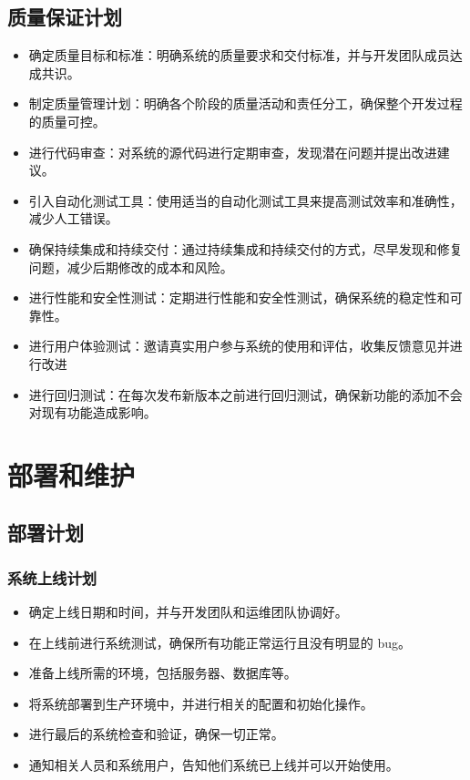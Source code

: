 \documentclass{article}
\begin{document}
\subsection{质量保证计划}
\begin{itemize}
	\item 确定质量目标和标准：明确系统的质量要求和交付标准，并与开发团队成员达成共识。
	\item 制定质量管理计划：明确各个阶段的质量活动和责任分工，确保整个开发过程的质量可控。
	\item 进行代码审查：对系统的源代码进行定期审查，发现潜在问题并提出改进建议。
	\item 引入自动化测试工具：使用适当的自动化测试工具来提高测试效率和准确性，减少人工错误。
	\item 确保持续集成和持续交付：通过持续集成和持续交付的方式，尽早发现和修复问题，减少后期修改的成本和风险。
	\item 进行性能和安全性测试：定期进行性能和安全性测试，确保系统的稳定性和可靠性。
	\item 进行用户体验测试：邀请真实用户参与系统的使用和评估，收集反馈意见并进行改进
	\item 进行回归测试：在每次发布新版本之前进行回归测试，确保新功能的添加不会对现有功能造成影响。
\end{itemize}


\section{部署和维护}
\subsection{部署计划}
\subsubsection{系统上线计划}
\begin{itemize}
	\item 确定上线日期和时间，并与开发团队和运维团队协调好。
	\item 在上线前进行系统测试，确保所有功能正常运行且没有明显的 bug。
	\item 准备上线所需的环境，包括服务器、数据库等。
	\item 将系统部署到生产环境中，并进行相关的配置和初始化操作。
	\item 进行最后的系统检查和验证，确保一切正常。
	\item 通知相关人员和系统用户，告知他们系统已上线并可以开始使用。
\end{itemize}
\end{document}
